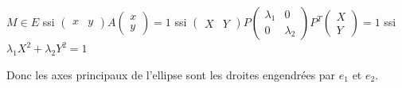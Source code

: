 \begin{exemple}
    $M \in E$ ssi $\begin{pmatrix}
        x & y
    \end{pmatrix} A \begin{pmatrix}
        x \\ y
    \end{pmatrix} = 1$ ssi $\begin{pmatrix}
        X & Y
    \end{pmatrix} P \begin{pmatrix}
        \lambda_1 & 0 \\
        0 & \lambda_2
    \end{pmatrix} P^T \begin{pmatrix}
        X \\ Y
    \end{pmatrix} = 1$ ssi $\lambda_1 X^2 + \lambda_2 Y^2 = 1$ 

    Donc les axes principaux de l'ellipse sont les droites engendrées par $e_1$ et $e_2$.
 
\end{exemple}
